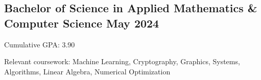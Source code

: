 \subsection{{Bachelor of Science in Applied Mathematics \& Computer Science \hfill May 2024}}
\begin{zitemize}
\item Cumulative GPA: 3.90
\item Relevant coursework: Machine Learning, Cryptography, Graphics, Systems, Algorithms, Linear Algebra, Numerical Optimization
\end{zitemize}
